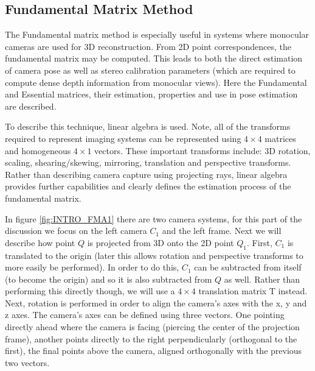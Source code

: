 \subsection{Fundamental Matrix Method}

\label{FundamentalMatrixSection}

The Fundamental matrix method is especially useful in systems where monocular cameras are used for 3D reconstruction. From 2D point correspondences, the fundamental matrix may be computed. This leads to both the direct estimation of camera pose as well as stereo calibration parameters (which are required to compute dense depth information from monocular views). Here the Fundamental and Essential matrices, their estimation, properties and use in pose estimation are described.

To describe this technique, linear algebra is used. Note, all of the transforms required to represent imaging systems can be represented using $4 \times 4$ matrices and homogeneous $4 \times 1$ vectors. These important transforms include: 3D rotation, scaling, shearing/skewing, mirroring, translation and perspective transforms. Rather than describing camera capture using projecting rays, linear algebra provides further capabilities and clearly defines the estimation process of the fundamental matrix. 

In figure \ref{fig:INTRO_FMA1} there are two camera systems, for this part of the discussion we focus on the left camera $C_{1}$ and the left frame. Next we will describe how point $Q$ is projected from 3D onto the 2D point $Q_{1}$. First, $C_{1}$ is translated to the origin (later this allows rotation and perspective transforms to more easily be performed). In order to do this, $C_{1}$ can be subtracted from itself (to become the origin) and so it is also subtracted from $Q$ as well. Rather than performing this directly though, we will use a $4 \times 4$ translation matrix T instead. Next, rotation is performed in order to align the camera's axes with the x, y and z axes. The camera's axes can be defined using three vectors. One pointing directly ahead where the camera is facing (piercing the center of the projection frame), another points directly to the right perpendicularly (orthogonal to the first), the final points above the camera, aligned orthogonally with the previous two vectors. \\

